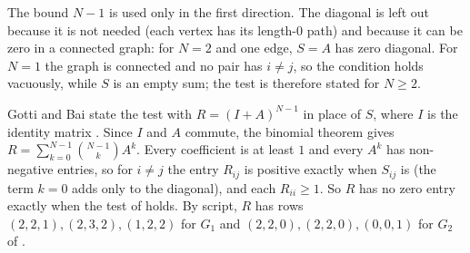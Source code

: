 The bound $N-1$ is used only in the first direction. The diagonal is left out because it is not needed (each vertex has its length-$0$ path) and because it can be zero in a connected graph: for $N = 2$ and one edge, $S = A$ has zero diagonal. For $N = 1$ the graph is connected and no pair has $i \ne j$, so the condition holds vacuously, while $S$ is an empty sum; the test is therefore stated for $N \ge 2$.

\begin{remark}\label{rem:binom}
Gotti and Bai state the test with $R = (I + A)^{N-1}$ in place of $S$, where $I$ is the identity matrix \cite[Proposition 3, p.~2]{gotti_18211_lecture27} \cite[Theorem 2, p.~1]{bai_bimsa_adjacency}. Since $I$ and $A$ commute, the binomial theorem gives $R = \sum_{k=0}^{N-1} \binom{N-1}{k} A^k$. Every coefficient is at least $1$ and every $A^k$ has non-negative entries, so for $i \ne j$ the entry $R_{ij}$ is positive exactly when $S_{ij}$ is (the term $k = 0$ adds only to the diagonal), and each $R_{ii} \ge 1$. So $R$ has no zero entry exactly when the test of  holds. By script, $R$ has rows $(2,2,1), (2,3,2), (1,2,2)$ for $G_1$ and $(2,2,0), (2,2,0), (0,0,1)$ for $G_2$ of .
\end{remark}
